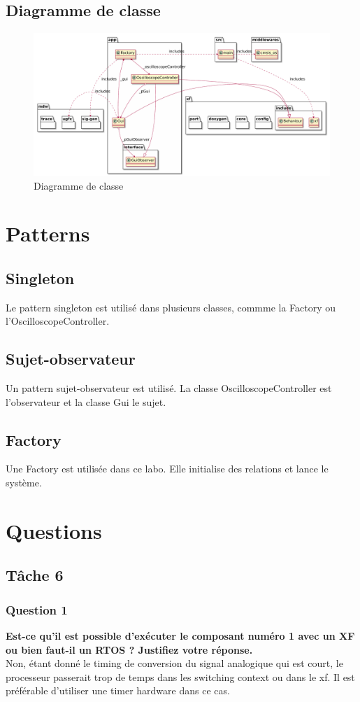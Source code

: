 \documentclass[12pt]{article}
\begin{document}
	\subsection{Diagramme de classe}
	\begin{figure}[H]
	\begin{center}
		\includegraphics[angle=270,scale=0.45]{Ressources/class.pdf}
		\caption{\label{class} Diagramme de classe}
	\end{center}
\end{figure}
	\section{Patterns}
	\subsection{Singleton}
	Le pattern singleton est utilisé dans plusieurs classes, commme la Factory ou l'OscilloscopeController.
	\subsection{Sujet-observateur}
	Un pattern sujet-observateur est utilisé. La classe OscilloscopeController est l'observateur et la classe Gui le sujet.
	\subsection{Factory}
	Une Factory est utilisée dans ce labo. Elle initialise des relations et lance le système.
	\section{Questions}
	\subsection{Tâche 6}
	\subsubsection{Question 1}
	\textbf{Est-ce qu'il est possible d'exécuter le composant numéro 1 avec un XF ou bien faut-il un RTOS ? Justifiez votre réponse.}\\
	Non, étant donné le timing de conversion du signal analogique qui est court, le processeur passerait trop de temps dans les switching context ou dans le xf. Il est préférable d'utiliser une timer hardware dans ce cas.
\end{document}
